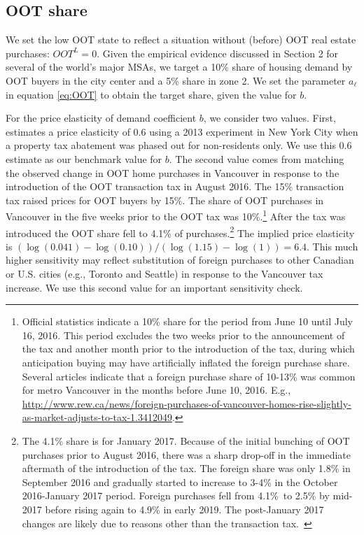 \documentclass[letterpaper,12pt,dvipsnames,usenames]{article}
\theoremstyle{definition}
\begin{document}
\begin{spacing}{1.25}
\subsection{OOT share}

We set the low OOT state to reflect a situation without (before) OOT real estate purchases: $OOT^L=0$. Given the empirical evidence discussed in Section 2 for several of the world's major MSAs, we target a 10\% share of housing demand by OOT buyers in the city center and a 5\% share in zone 2. We set the parameter $a_{\ell}$ in equation \eqref{eq:OOT} to obtain the target share, given the value for $b$.

For  the price elasticity of demand coefficient $b$, we consider two values. First, \citet{suher} estimates a  price elasticity of 0.6 using a 2013 experiment in New York City when a property tax abatement was phased out for non-residents only. We use this 0.6  estimate as our benchmark value for $b$. The second value comes from matching the observed change in OOT home purchases in Vancouver in response to the introduction of the OOT transaction tax in August 2016. The 15\% transaction tax raised prices for OOT buyers by 15\%. The share of OOT purchases in Vancouver in the five weeks prior to the OOT tax was  10\%.\footnote{Official statistics indicate a 10\% share for the period from June 10 until July 16, 2016. This period excludes the two weeks prior to the announcement of the tax and another month prior to the introduction of the tax, during which anticipation buying may have artificially inflated the foreign purchase share.  Several articles indicate that a foreign purchase share of 10-13\% was common for metro Vancouver in the months before June 10, 2016. E.g., \url{http://www.rew.ca/news/foreign-purchases-of-vancouver-homes-rise-slightly-as-market-adjusts-to-tax-1.3412049}. } After the tax was introduced the OOT share fell to 4.1\% of purchases.\footnote{The 4.1\% share is for January 2017. Because of the initial bunching of OOT purchases prior to August 2016, there was a sharp drop-off in the immediate aftermath of the introduction of the tax. The foreign share was only 1.8\% in September 2016 and gradually started to increase to 3-4\% in the October 2016-January 2017 period. Foreign purchases fell from 4.1\%\ to 2.5\% by mid-2017 before  rising again to 4.9\% in early 2019. The post-January 2017 changes are likely due to reasons other than the transaction tax.\ } The implied price elasticity is $(\log(0.041)-\log(0.10))/(\log(1.15)-\log(1))=6.4$. This much higher sensitivity may reflect substitution of foreign purchases to other Canadian or U.S. cities (e.g., Toronto and Seattle) in response to the Vancouver tax increase. We use this second value for an important sensitivity check.


\end{spacing}
\end{document}
